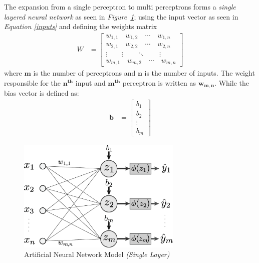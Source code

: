\documentclass[12pt]{extarticle}
\begin{document}
	The expansion from a single perceptron to multi perceptrons forms a \emph{single layered neural network} as seen in \emph{Figure~\ref{fig:ANN}}; using the input vector as seen in \emph{Equation \ref{inputs}} and defining the weights matrix 
	\begin{align}
		 W &= \begin{bmatrix}\label{weights_expanded}
			w_{1,1}\quad w_{1,2} \quad \cdots \quad w_{1,n}\\
			w_{2,1} \quad w_{2,2} \quad \cdots \quad w_{2,n}\\
			\vdots \qquad \vdots \qquad \ddots \qquad \vdots\\
			w_{m,1} \quad w_{m,2} \quad \cdots \quad w_{m,n}
		\end{bmatrix}
	\end{align}
	where $\bm{m}$ is the number of perceptrons and $\bm{n}$ is the number of inputs. The weight responsible for the $\bm{n^{th}}$ input and $\bm{m^{th}}$ perceptron is written as $\bm{w_{m,n}}$. While the bias vector is defined as:
	\begin{align}
		\bm{b} &= \begin{bmatrix}\label{bias_vector}
			b_1 \\
			b_2 \\
			\vdots \\
			b_m
		\end{bmatrix}
	\end{align}

	\begin{figure}[h]
	\centering
	\includegraphics[width=0.7\textwidth]{pics/Figures/ANN.eps}
	\caption{\small{Artificial Neural Network Model \emph{(Single Layer)}}}
	\label{fig:ANN}
	\end{figure}
\end{document}
